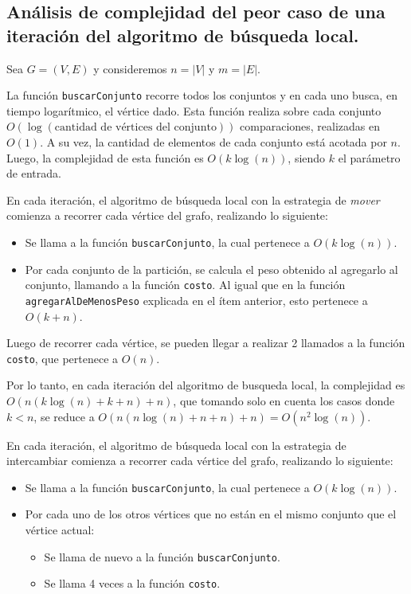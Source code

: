 \newpage
\subsection{Análisis de complejidad del peor caso de una iteración del
            algoritmo de búsqueda local.}
\vspace*{0.3cm}

Sea $G = (V,E)$ y consideremos $n = |V|$ y $m = |E|$.

La función \texttt{buscarConjunto} recorre todos los conjuntos y en cada uno
busca, en tiempo logarítmico, el vértice dado. Esta función realiza sobre cada
conjunto $O(\log(\text{cantidad de vértices del conjunto}))$ comparaciones,
realizadas en $O(1)$. A su vez, la cantidad de elementos de cada conjunto está
acotada por $n$. Luego, la complejidad de esta función es $O(k\log(n))$, siendo
$k$ el parámetro de entrada.

\vspace*{0.3cm}

En cada iteración, el algoritmo de búsqueda local con la estrategia de
\textit{mover} comienza a recorrer cada vértice del grafo, realizando lo siguiente:
\begin{itemize}
  \item Se llama a la función \texttt{buscarConjunto}, la cual pertenece a
  $O(k\log(n))$.

  \item Por cada conjunto de la partición, se calcula el peso obtenido al
  agregarlo al conjunto, llamando a la función \texttt{costo}. Al igual que en
  la función \texttt{agregarAlDeMenosPeso} explicada en el ítem anterior, esto
  pertenece a $O(k + n)$.
\end{itemize}

Luego de recorrer cada vértice, se pueden llegar a realizar 2 llamados a
la función \texttt{costo}, que pertenece a $O(n)$.

Por lo tanto, en cada iteración del algoritmo de busqueda local, la complejidad
es $O(n (k\log(n) + k + n) + n)$, que tomando solo en cuenta los casos donde
$k < n$, se reduce a $O(n (n\log(n) + n + n) + n) = O(n^2 \log(n))$.

\vspace*{0.3cm}

En cada iteración, el algoritmo de búsqueda local con la estrategia de
intercambiar comienza a recorrer cada vértice del grafo, realizando lo siguiente:

\begin{itemize}
  \item Se llama a la función \texttt{buscarConjunto}, la cual pertenece a
  $O(k\log(n))$.

  \item Por cada uno de los otros vértices que no están en el mismo conjunto
  que el vértice actual:

  \begin{itemize}
    \item Se llama de nuevo a la función \texttt{buscarConjunto}.

    \item Se llama 4 veces a la función \texttt{costo}.
  \end{itemize}
\end{itemize}

